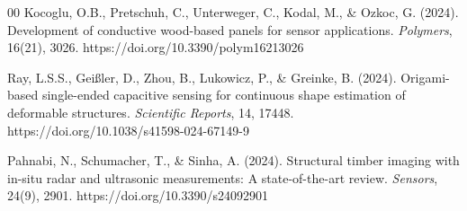\documentclass[conference]{IEEEtran}
\begin{document}
\begin{thebibliography}{00}
 Kocoglu, O.B., Pretschuh, C., Unterweger, C., Kodal, M., \& Ozkoc, G. (2024). Development of conductive wood-based panels for sensor applications. \textit{Polymers}, 16(21), 3026. https://doi.org/10.3390/polym16213026

 Ray, L.S.S., Gei\ss{}ler, D., Zhou, B., Lukowicz, P., \& Greinke, B. (2024). Origami-based single-ended capacitive sensing for continuous shape estimation of deformable structures. \textit{Scientific Reports}, 14, 17448. https://doi.org/10.1038/s41598-024-67149-9

 Pahnabi, N., Schumacher, T., \& Sinha, A. (2024). Structural timber imaging with in-situ radar and ultrasonic measurements: A state-of-the-art review. \textit{Sensors}, 24(9), 2901. https://doi.org/10.3390/s24092901

\end{thebibliography}
\end{document}
